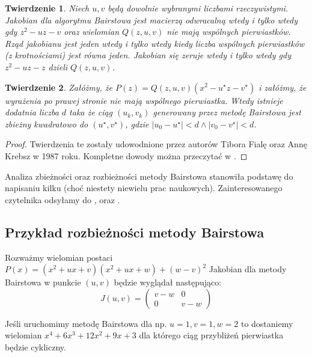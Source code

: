 \documentclass{article}
\newtheorem{thm}{Twierdzenie}
\begin{document}
\begin{thm}
Niech $u, v$ będą dowolnie wybranymi liczbami rzeczywistymi. Jakobian dla algorytmu Bairstowa jest macierzą odwracalną wtedy i tylko wtedy gdy $z^2 - uz - v$ oraz wielomian $Q(z,u,v)$ nie mają wspólnych pierwiastków. Rząd jakobianu jest jeden wtedy i tylko wtedy kiedy liczba wspólnych pierwiastków (z krotnościami) jest równa jeden. Jakobian się zeruje wtedy i tylko wtedy gdy $z^2 - uz - z$ dzieli $Q(z,u,v)$.
\end{thm}

\begin{thm}
Załóżmy, że $P(z) = Q(z, u, v) (x^2 - u^{\star} z - v^{\star})$ i załóżmy, że wyrażenia po prawej stronie nie mają wspólnego pierwiastka. Wtedy istnieje dodatnia liczba $d$ taka że ciąg $(u_k, v_k)$ generowany przez metodę Bairstowa jest zbieżny kwadratowo do $(u^{\star}, v^{\star})$, gdzie $|u_0 - u^{\star}| < d \wedge |v_0 - v^{\star}| < d$. 
\end{thm}

\begin{proof}
Twierdzenia te zostały udowodnione przez autorów Tibora Fialę oraz Annę Krebsz w 1987 roku. Kompletne dowody można przeczytać w \cite{krebsz}.
\end{proof}

Analiza zbieżności oraz rozbieżności metody Bairstowa stanowiła podstawę do napisaniu kilku (choć niestety niewielu prac naukowych). Zainteresowanego czytelnika odsyłamy do \cite{krebsz}, \cite{Gabler} oraz \cite{Glasson}. 

\subsection{Przykład rozbieżności metody Bairstowa}

Rozważmy wielomian postaci $P(x) = (x^2 + ux + v)(x^2 + ux + w) + (w-v)^2$
Jakobian dla metody Bairstowa w punkcie $(u,v)$ będzie wyglądał następująco:
$$
J(u,v) = \begin{pmatrix}
v-w & 0\\ 
0 & v-w 
\end{pmatrix}
$$

Jeśli uruchomimy metodę Bairstowa dla np. $u = 1, v = 1, w = 2$ to dostaniemy wielomian $x^4 + 6x^3 + 12x^2 + 9x +3 $ dla którego ciąg przybliżeń pierwiastka będzie cykliczny.
\end{document}
